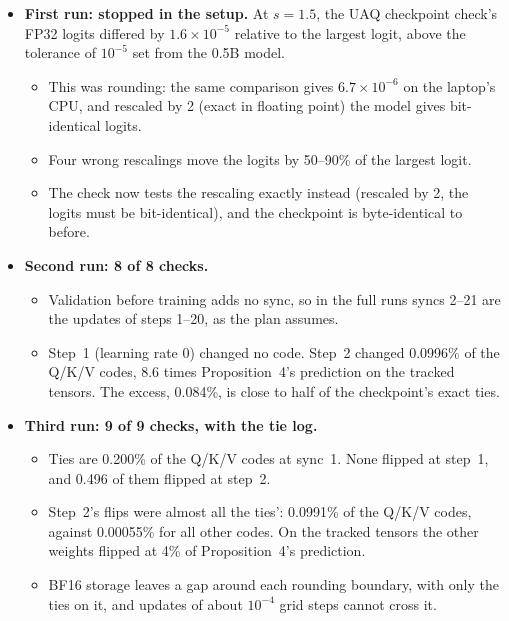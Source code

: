 \documentclass[11pt]{article}
\begin{document}
\begin{itemize}
\item \textbf{First run: stopped in the setup.} At $s=1.5$, the UAQ checkpoint check's FP32 logits differed by $1.6\times10^{-5}$ relative to the largest logit, above the tolerance of $10^{-5}$ set from the 0.5B model.
  \begin{itemize}
  \item This was rounding: the same comparison gives $6.7\times10^{-6}$ on the laptop's CPU, and rescaled by 2 (exact in floating point) the model gives bit-identical logits.
  \item Four wrong rescalings move the logits by 50--90\% of the largest logit.
  \item The check now tests the rescaling exactly instead (rescaled by 2, the logits must be bit-identical), and the checkpoint is byte-identical to before.
  \end{itemize}
\item \textbf{Second run: 8 of 8 checks.}
  \begin{itemize}
  \item Validation before training adds no sync, so in the full runs syncs 2--21 are the updates of steps 1--20, as the plan assumes.
  \item Step~1 (learning rate 0) changed no code. Step~2 changed 0.0996\% of the Q/K/V codes, 8.6 times Proposition~4's prediction on the tracked tensors. The excess, 0.084\%, is close to half of the checkpoint's exact ties.
  \end{itemize}
\item \textbf{Third run: 9 of 9 checks, with the tie log.}
  \begin{itemize}
  \item Ties are 0.200\% of the Q/K/V codes at sync~1. None flipped at step~1, and 0.496 of them flipped at step~2.
  \item Step~2's flips were almost all the ties': 0.0991\% of the Q/K/V codes, against 0.00055\% for all other codes. On the tracked tensors the other weights flipped at 4\% of Proposition~4's prediction.
  \item BF16 storage leaves a gap around each rounding boundary, with only the ties on it, and updates of about $10^{-4}$ grid steps cannot cross it.
  \end{itemize}
\end{itemize}

\end{document}
